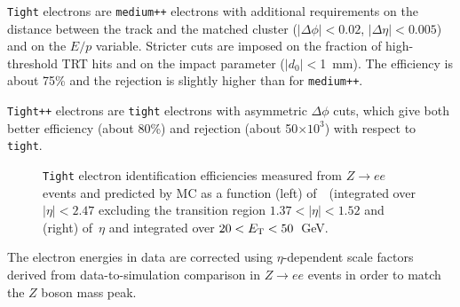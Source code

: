 \texttt{Tight} electrons are \texttt{medium++} electrons with additional requirements on the distance
between the track and the matched cluster ($|\Delta\phi|<0.02$, $|\Delta\eta|<0.005$) and on the $E/p$
variable. Stricter cuts are imposed on the fraction of high-threshold TRT hits and on the impact parameter
($|d_0|<$1~mm). The efficiency is about 75\% and the rejection is slightly higher than 
for \texttt{medium++}.

\texttt{Tight++} electrons are \texttt{tight} electrons with asymmetric $\Delta\phi$ cuts, which give
both better efficiency (about 80\%) and rejection (about 50$\times 10^3$) with respect to \texttt{tight}.

\begin{figure}[tb]\begin{center}
	\caption{\texttt{Tight} electron identification efficiencies measured from $Z\to ee$ events and predicted by MC as a function (left) of~\ET\ (integrated over $|\eta|< 2.47$ excluding the transition region $1.37< |\eta|<1.52$ and (right) of~$\eta$ and integrated over $20< \ET<50$~GeV.~\cite{eperf}\label{fig:eleeff}}
\end{center}\end{figure}

The electron energies in data are corrected using $\eta$-dependent  scale factors derived
from data-to-simulation comparison in $Z\to ee$ events in order to match the $Z$ boson 
mass peak.


